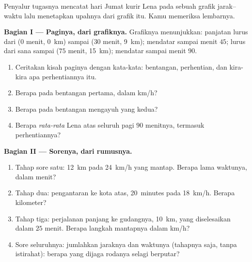 \begin{problem}\label{pb:g7:motion-average-speed:1}
Penyalur tugasnya mencatat hari Jumat kurir Lena pada sebuah grafik
jarak--waktu lalu menetapkan upahnya dari grafik itu. Kamu memeriksa
lembarnya.

\medskip\noindent\textbf{Bagian I --- Paginya, dari
grafiknya.}
Grafiknya menunjukkan: panjatan lurus dari ($0$ menit, \qty{0}{km})
sampai ($30$ menit, \qty{9}{km}); mendatar sampai menit $45$; lurus
dari sana sampai ($75$ menit, \qty{15}{km}); mendatar sampai menit $90$.
\begin{enumerate}
  \item Ceritakan kisah paginya dengan kata-kata: bentangan,
        perhentian, dan kira-kira apa perhentiannya itu.
  \item Berapa  pada bentangan pertama, dalam \unit{km/h}?
  \item Berapa  pada bentangan mengayuh yang kedua?
  \item Berapa  \emph{rata-rata} Lena atas seluruh pagi $90$
        menitnya, termasuk perhentiannya?
\end{enumerate}

\medskip\noindent\textbf{Bagian II --- Sorenya, dari
rumusnya.}
\begin{enumerate}[resume]
  \item Tahap sore satu: \qty{12}{km} pada \qty{24}{km/h} yang
        mantap. Berapa lama waktunya, dalam menit?
  \item Tahap dua: pengantaran ke kota atas, \qty{20}{minutes} pada
        \qty{18}{km/h}. Berapa kilometer?
  \item Tahap tiga: perjalanan panjang ke gudangnya, \qty{10}{km},
        yang diselesaikan dalam $25$ menit. Berapa  langkah
        mantapnya dalam \unit{km/h}?
  \item Sore seluruhnya: jumlahkan jaraknya dan waktunya (tahapnya
        saja, tanpa istirahat):  berapa yang dijaga
        rodanya selagi berputar?
\end{enumerate}


\end{problem}
